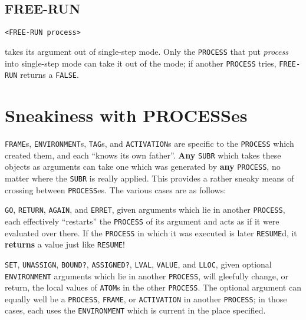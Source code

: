 \documentclass[a4paper]{scrbook}
\begin{document}
\subsection{FREE-RUN}\label{free-run}

\begin{verbatim}
<FREE-RUN process>
\end{verbatim}

 takes its argument out of single-step mode. Only the \texttt{PROCESS} that put
\emph{process} into single-step mode can take it out of the mode; if another \texttt{PROCESS} tries, \texttt{FREE-RUN}
returns a \texttt{FALSE}.

\section{Sneakiness with PROCESSes}\label{sneakiness-with-processes}

\texttt{FRAME}s, \texttt{ENVIRONMENT}s, \texttt{TAG}s, and \texttt{ACTIVATION}s are specific to the
\texttt{PROCESS} which created them, and each ``knows its own father''. \textbf{Any} \texttt{SUBR} which takes these
objects as arguments can take one which was generated by \textbf{any} \texttt{PROCESS}, no matter where the \texttt{SUBR}
is really applied. This provides a rather sneaky means of crossing between \texttt{PROCESS}es. The various cases are as
follows:

\texttt{GO}, \texttt{RETURN}, \texttt{AGAIN}, and
\texttt{ERRET}, given arguments which lie in another \texttt{PROCESS}, each effectively ``restarts''
the \texttt{PROCESS} of its argument and acts as if it were evaluated over there. If the \texttt{PROCESS} in which it was
executed is later \texttt{RESUME}d, it \textbf{returns} a value just like \texttt{RESUME}!

\texttt{SET}, \texttt{UNASSIGN}, \texttt{BOUND?},
\texttt{ASSIGNED?}, \texttt{LVAL}, \texttt{VALUE}, and
\texttt{LLOC}, given optional \texttt{ENVIRONMENT} arguments which lie in another \texttt{PROCESS},
will gleefully change, or return, the local values of \texttt{ATOM}s in the other \texttt{PROCESS}. The optional argument
can equally well be a \texttt{PROCESS}, \texttt{FRAME}, or \texttt{ACTIVATION} in another \texttt{PROCESS}; in those cases,
each uses the \texttt{ENVIRONMENT} which is current in the place specified.
\end{document}
